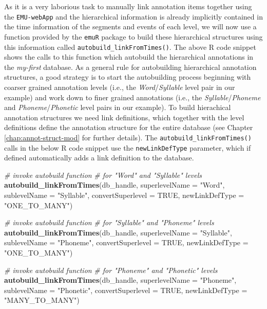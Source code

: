 \documentclass[]{book}
\newenvironment{Shaded}{\begin{snugshade}}{\end{snugshade}}
\newcommand{\CommentTok}[1]{\textcolor[rgb]{0.56,0.35,0.01}{\textit{#1}}}
\newcommand{\DataTypeTok}[1]{\textcolor[rgb]{0.13,0.29,0.53}{#1}}
\newcommand{\KeywordTok}[1]{\textcolor[rgb]{0.13,0.29,0.53}{\textbf{#1}}}
\newcommand{\NormalTok}[1]{#1}
\newcommand{\OtherTok}[1]{\textcolor[rgb]{0.56,0.35,0.01}{#1}}
\newcommand{\StringTok}[1]{\textcolor[rgb]{0.31,0.60,0.02}{#1}}
\begin{document}
As it is a very laborious task to manually link annotation items together using the \texttt{EMU-webApp} and the hierarchical information is already implicitly contained in the time information of the segments and events of each level, we will now use a function provided by the \texttt{emuR} package to build these hierarchical structures using this information called \texttt{autobuild\_linkFromTimes()}. The above R code snippet shows the calls to this function which autobuild the hierarchical annotations in the \emph{my-first} database. As a general rule for autobuilding hierarchical annotation structures, a good strategy is to start the autobuilding process beginning with coarser grained annotation levels (i.e., the \emph{Word}/\emph{Syllable} level pair in our example) and work down to finer grained annotations (i.e., the \emph{Syllable}/\emph{Phoneme} and \emph{Phoneme}/\emph{Phonetic} level pairs in our example). To build hierachical annotation structures we need link definitions, which together with the level definitions define the annotation structure for the entire database (see Chapter \ref{chap:annot-struct-mod} for further details). The \texttt{autobuild\_linkFromTimes()} calls in the below R code snippet use the \texttt{newLinkDefType} parameter, which if defined automatically adds a link definition to the database.

\begin{Shaded}
\begin{Highlighting}[]
\CommentTok{# invoke autobuild function}
\CommentTok{# for "Word" and "Syllable" levels}
\KeywordTok{autobuild_linkFromTimes}\NormalTok{(db_handle,}
                        \DataTypeTok{superlevelName =} \StringTok{"Word"}\NormalTok{,}
                        \DataTypeTok{sublevelName =} \StringTok{"Syllable"}\NormalTok{,}
                        \DataTypeTok{convertSuperlevel =} \OtherTok{TRUE}\NormalTok{,}
                        \DataTypeTok{newLinkDefType =} \StringTok{"ONE_TO_MANY"}\NormalTok{)}

\CommentTok{# invoke autobuild function}
\CommentTok{# for "Syllable" and "Phoneme" levels}
\KeywordTok{autobuild_linkFromTimes}\NormalTok{(db_handle,}
                        \DataTypeTok{superlevelName =} \StringTok{"Syllable"}\NormalTok{,}
                        \DataTypeTok{sublevelName =} \StringTok{"Phoneme"}\NormalTok{,}
                        \DataTypeTok{convertSuperlevel =} \OtherTok{TRUE}\NormalTok{,}
                        \DataTypeTok{newLinkDefType =} \StringTok{"ONE_TO_MANY"}\NormalTok{)}

\CommentTok{# invoke autobuild function}
\CommentTok{# for "Phoneme" and "Phonetic" levels}
\KeywordTok{autobuild_linkFromTimes}\NormalTok{(db_handle,}
                        \DataTypeTok{superlevelName =} \StringTok{"Phoneme"}\NormalTok{,}
                        \DataTypeTok{sublevelName =} \StringTok{"Phonetic"}\NormalTok{,}
                        \DataTypeTok{convertSuperlevel =} \OtherTok{TRUE}\NormalTok{,}
                        \DataTypeTok{newLinkDefType =} \StringTok{"MANY_TO_MANY"}\NormalTok{)}
\end{Highlighting}
\end{Shaded}
\end{document}
